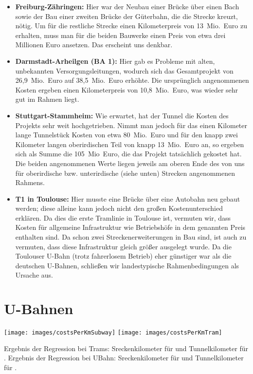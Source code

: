 \begin{itemize}

    \item \textbf{Freiburg-Zähringen:} Hier war der Neubau einer Brücke über einen Bach sowie der Bau einer zweiten Brücke der Güterbahn, die die Strecke kreuzt, nötig. Um für die restliche Strecke einen Kilometerpreis von 13{\ }Mio.{\ }Euro zu erhalten, muss man für die beiden Bauwerke einen Preis von etwa drei Millionen Euro ansetzen. Das erscheint uns denkbar.
    \item \textbf{Darmstadt-Arheilgen (BA 1):} Hier gab es Probleme mit alten, unbekannten Versorgungsleitungen, wodurch sich das Gesamtprojekt von 26,9{\ }Mio.{\ }Euro auf 38,5{\ }Mio.{\ }Euro erhöhte. Die ursprünglich angenommenen Kosten ergeben einen Kilometerpreis von 10,8{\ }Mio.{\ }Euro, was wieder sehr gut im Rahmen liegt.
    \item \textbf{Stuttgart-Stammheim:} Wie erwartet, hat der Tunnel die Kosten des Projekts sehr weit hochgetrieben. Nimmt man jedoch für das einen Kilometer lange Tunnelstück Kosten von etwa 80{\ }Mio.{\ }Euro und für den knapp zwei Kilometer langen oberirdischen Teil von knapp 13{\ }Mio.{\ }Euro an, so ergeben sich als Summe die 105{\ }Mio{\ }Euro, die das Projekt tatsächlich gekostet hat. Die beiden angenommenen Werte liegen jeweils am oberen Ende des von uns für oberirdische bzw. unterirdische (siehe unten) Strecken angenommenen Rahmens.
    \item \textbf{T1 in Toulouse:} Hier musste eine Brücke über eine Autobahn neu gebaut werden; diese alleine kann jedoch nicht den großen Kostenunterschied erklären. Da dies die erste Tramlinie in Toulouse ist, vermuten wir, dass Kosten für allgemeine Infrastruktur wie Betriebshöfe in dem genannten Preis enthalten sind. Da schon zwei Streckenerweiterungen in Bau sind, ist auch zu vermuten, dass diese Infrastruktur gleich größer ausgelegt wurde. Da die Toulouser U-Bahn (trotz fahrerlosem Betrieb) eher günstiger war als die deutschen U-Bahnen, schließen wir landestypische Rahmenbedingungen als Ursache aus.

\end{itemize}

\section{U-Bahnen}








\texttt{[image: images/costsPerKmSubway]}
\texttt{[image: images/costsPerKmTram]}

Ergebnis der Regression bei Trams: Sreckenkilometer für \tramnormal und Tunnelkilometer für \tramtunnel.
Ergebnis der Regression bei UBahn: Sreckenkilometer für \subwaynormal und Tunnelkilometer für \subwaytunnel.

